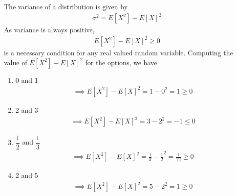 The variance of a distribution is given by
\begin{align}
    \sigma^2 %
    = E[X^2] - E[X]^2
\end{align}
As variance is always positive, 
\begin{align}
    E[X^2] - E[X]^2 \geq 0
\end{align}
is a necessary condition for any real valued random variable. Computing the value of $E[X^2] - E[X]^2$ for the options, we have
\begin{enumerate}[label=(\Alph*)]
\setlength\itemsep{2em}
\item 0 and 1
\begin{align}
    \implies E[X^2] - E[X]^2 = 1 -0^2 = 1 \geq 0
\end{align}
\item 2 and 3
\begin{align}
    \implies E[X^2] - E[X]^2 =3 -2^2 =-1 \leq 0 \label{negative_variance}
\end{align}
\item $\dfrac{1}{2}$ and $\dfrac{1}{3}$
\begin{align}
    \implies E[X^2] - E[X]^2 = \frac{1}{3} - \frac{1}{2}^2 = \frac{1}{12}\geq 0
\end{align}
\item 2 and 5
\begin{align}
    \implies E[X^2] - E[X]^2 = 5 -2^2 = 1 \geq 0
\end{align}
\end{enumerate}